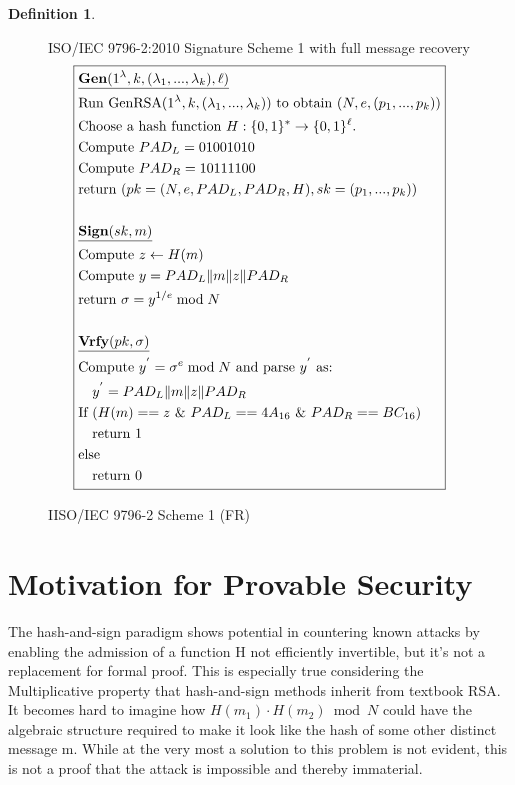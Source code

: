\documentclass[]{final_report}
\theoremstyle{definition}
\newtheorem{definition}{Definition}[chapter]
\begin{document}
\begin{definition}
\begin{figure}[H]
\centering
\hfill ISO/IEC 9796-2:2010 Signature Scheme 1 with full message recovery\hfill\phantom{} 
\[
\boxed{
\begin{aligned}
&\underline{\textbf{\text{Gen}} (1^\lambda, k, (\lambda_{1},...,\lambda_{k}), \ell)} \\
&\text{Run GenRSA}(1^\lambda, k, (\lambda_{1},...,\lambda_{k})) \text{ to obtain } (N, e, (p_{1},...,p_{k})) \\
&\text{Choose a hash function } H : \{0, 1\}^* \rightarrow \{0, 1\}^\ell. \\
&\text{Compute } PAD_{L} = 01001010 \\
&\text{Compute } PAD_{R} = 10111100 \\
&\text{return } (pk = (N, e, PAD_{L}, PAD_{R}, H), sk = (p_{1},...,p_{k})) \\
\\
&\underline{\textbf{\text{Sign}} (sk, m)} \\
&\text{Compute } z \leftarrow H(m) \\
&\text{Compute } y = PAD_{L} \| m \| z \| PAD_{R} \\
&\text{return } \sigma = y^{1/e} \bmod N \\
\\
&\underline{\textbf{\text{Vrfy}} (pk, \sigma)} \\
&\text{Compute } y^{'} = \sigma^{e} \bmod N \text{ and parse } y^{'} \text{ as: } \\
&\quad y^{'} = PAD_{L} \| m \| z \| PAD_{R} \\
&\text{If } (H(m) == z \text{ } \& \text{ } PAD_{L} == 4A_{16} \text{ } \& \text{ } PAD_{R} == BC_{16}) \\
&\quad \text{return } 1 \\
&\text{else} \\
&\quad \text{return } 0 
\end{aligned}
}
\]
\caption{IISO/IEC 9796-2 Scheme 1 (FR)}
\label{fig:isoiec9796-full}
\end{figure}
\end{definition}


\section{Motivation for Provable Security}
The hash-and-sign paradigm shows potential in countering known attacks by enabling the admission of a function H not efficiently invertible, but it's not a replacement for formal proof. This is especially true considering the Multiplicative property that hash-and-sign methods inherit from textbook RSA. It becomes hard to imagine how $H(m_{1}) \cdot H(m_{2}) \bmod N$ could have the algebraic structure required to make it look like the hash of some other distinct message m. While at the very most a solution to this problem is not evident, this is not a proof that the attack is impossible and thereby immaterial.
\end{document}
